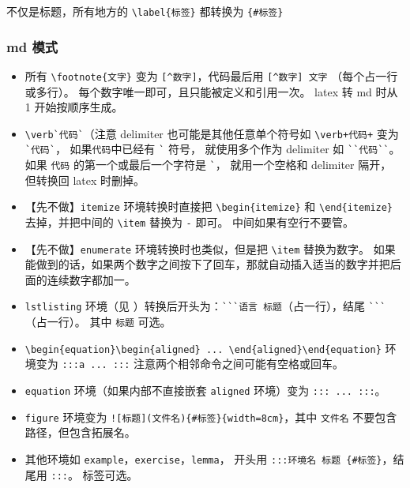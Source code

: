 
不仅是标题，所有地方的 \verb`\label{标签}` 都转换为 \verb`{#标签}`

\subsubsection{md 模式}
\begin{itemize}



\item 所有 \verb`\footnote{文字}` 变为 \verb`[^数字]`，代码最后用 \verb`[^数字] 文字` （每个占一行或多行）。 每个数字唯一即可，且只能被定义和引用一次。 latex 转 md 时从 1 开始按顺序生成。


\item \verb|\verb`代码`|（注意 delimiter 也可能是其他任意单个符号如 \verb`\verb+代码+` 变为 \verb|`代码`|， 如果\verb`代码`中已经有 \verb|`| 符号， 就使用多个作为 delimiter 如 \verb|``代码``|。 如果 \verb`代码` 的第一个或最后一个字符是 \verb|`|， 就用一个空格和 delimiter  隔开， 但转换回 latex 时删掉。

\item 【先不做】\verb`itemize` 环境转换时直接把 \verb`\begin{itemize}` 和 \verb`\end{itemize}` 去掉，并把中间的 \verb`\item` 替换为 \verb`-` 即可。 中间如果有空行不要管。
\item 【先不做】\verb`enumerate` 环境转换时也类似，但是把 \verb`\item` 替换为数字。 如果能做到的话，如果两个数字之间按下了回车，那就自动插入适当的数字并把后面的连续数字都加一。
\item \verb`lstlisting` 环境（见 ）转换后开头为：\verb|```语言 标题|（占一行），结尾 \verb|```|（占一行）。 其中 \verb`标题` 可选。
\item \verb`\begin{equation}\begin{aligned} ... \end{aligned}\end{equation}` 环境变为 \verb`:::a ... :::` 注意两个相邻命令之间可能有空格或回车。
\item \verb`equation` 环境（如果内部不直接嵌套 \verb`aligned` 环境）变为 \verb`::: ... :::`。
\item \verb`figure` 环境变为 \verb`![标题](文件名){#标签}{width=8cm}`，其中 \verb`文件名` 不要包含路径，但包含拓展名。
\item 其他环境如 \verb`example`，\verb`exercise`，\verb`lemma`， 开头用 \verb`:::环境名 标题 {#标签}`，结尾用 \verb`:::`。 标签可选。
\end{itemize}

